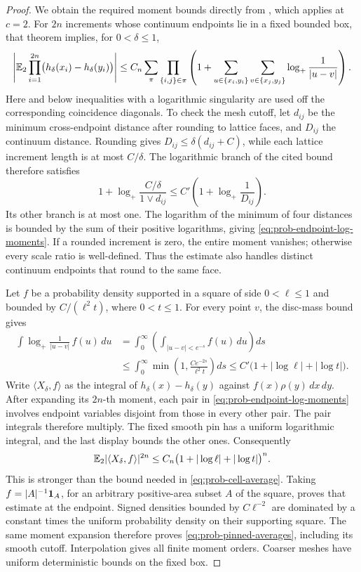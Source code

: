 \begin{proof}
We obtain the required moment bounds directly from
\cite[Theorem~4.5 and equations~(28)--(30)]{DKLM2026}, which applies
at \(c=2\). For \(2n\) increments whose continuum endpoints lie in
a fixed bounded box, that theorem implies, for \(0<\delta\le1\),
\begin{equation}\label{eq:prob-endpoint-log-moments}
 \left|\mathbb E_2\prod_{i=1}^{2n}
       \bigl(h_\delta(x_i)-h_\delta(y_i)\bigr)\right|
 \le C_n\sum_\pi\prod_{\{i,j\}\in\pi}
 \left(1+\sum_{u\in\{x_i,y_i\}}
              \sum_{v\in\{x_j,y_j\}}
                    \log_+\frac1{|u-v|}\right).
\end{equation}
Here and below inequalities with a logarithmic singularity are used
off the corresponding coincidence diagonals. To check the mesh cutoff,
let \(d_{ij}\) be the minimum cross-endpoint distance after rounding
to lattice faces, and \(D_{ij}\) the continuum distance. Rounding gives
\(D_{ij}\le\delta(d_{ij}+C)\), while each lattice increment length
is at most \(C/\delta\). The logarithmic branch of the cited bound
therefore satisfies
\[
 1+\log_+\frac{C/\delta}{1\vee d_{ij}}
       \le C'\left(1+\log_+\frac1{D_{ij}}\right).
\]
Its other branch is at most one. The logarithm of the minimum of
four distances is bounded by the sum of their positive logarithms,
giving \eqref{eq:prob-endpoint-log-moments}. If a rounded increment
is zero, the entire moment vanishes; otherwise every scale ratio is
well-defined. Thus the estimate also
handles distinct continuum endpoints that round to the same face.

Let \(f\) be a probability density supported in a square of side
\(0<\ell\le1\) and bounded by \(C/(\ell^2t)\), where \(0<t\le1\).
For every point \(v\), the disc-mass bound gives
\begin{align*}
 \int\log_+\frac1{|u-v|}\,f(u)\,du
 &=\int_0^\infty\!\left(\int_{|u-v|<e^{-s}}f(u)\,du\right)ds\\
 &\le\int_0^\infty\min\left(1,
                      \frac{C e^{-2s}}{\ell^2t}\right)ds
 \le C'\bigl(1+|\log\ell|+|\log t|\bigr).
\end{align*}
Write \(\langle X_\delta,f\rangle\) as the integral of
\(h_\delta(x)-h_\delta(y)\) against \(f(x)\rho(y)\,dx\,dy\).
After expanding its \(2n\)-th moment, each pair in
\eqref{eq:prob-endpoint-log-moments} involves endpoint variables
disjoint from those in every other pair. The pair integrals therefore
multiply. The fixed smooth pin has a uniform logarithmic integral,
and the last display bounds the other ones. Consequently
\[
 \mathbb E_2|\langle X_\delta,f\rangle|^{2n}
 \le C_n\bigl(1+|\log\ell|+|\log t|\bigr)^n.
\]
This is stronger than the bound needed in
\eqref{eq:prob-cell-average}. Taking
\(f=|A|^{-1}\mathbf1_A\), for an arbitrary positive-area subset
\(A\) of the square, proves that estimate at the endpoint.
Signed densities bounded by \(C\ell^{-2}\) are dominated by a
constant times the uniform probability density on their supporting
square. The same moment expansion therefore proves
\eqref{eq:prob-pinned-averages}, including its smooth cutoff.
Interpolation gives all finite moment orders. Coarser meshes have
uniform deterministic bounds on the fixed box.


\end{proof}
